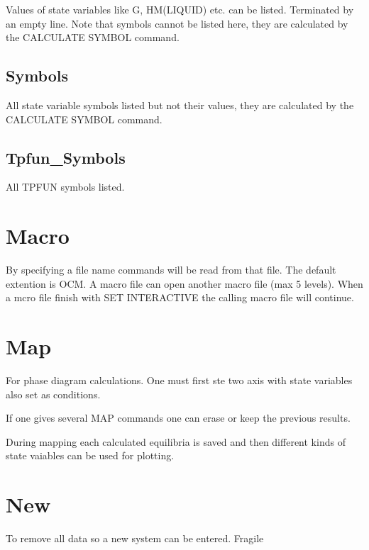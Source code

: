 \documentclass[12pt]{article}
\begin{document}
Values of state variables like G, HM(LIQUID) etc. can be listed.
Terminated by an empty line.  Note that symbols cannot be listed here,
they are calculated by the CALCULATE SYMBOL command.

\subsection{Symbols}

All state variable symbols listed but not their values, they are
calculated by the CALCULATE SYMBOL command.

\subsection{Tpfun\_Symbols}

All TPFUN symbols listed.

\section{Macro }

By specifying a file name commands will be read from that file.  The
default extention is OCM.  A macro file can open another macro file
(max 5 levels).  When a mcro file finish with SET INTERACTIVE the
calling macro file will continue.

\section{Map }

For phase diagram calculations.  One must first ste two axis with
state variables also set as conditions.

If one gives several MAP commands one can erase or keep the previous
results.

During mapping each calculated equilibria is saved and then different
kinds of state vaiables can be used for plotting.

\section{New }

To remove all data so a new system can be entered.  Fragile
\end{document}
